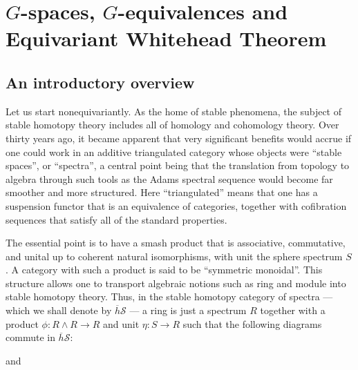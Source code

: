 \chapter{$G$-spaces, $G$-equivalences and Equivariant Whitehead Theorem}

\section{An introductory overview}

Let us start nonequivariantly. As the home of stable phenomena, the subject of stable homotopy theory includes all of homology and cohomology theory. Over thirty years ago, it became apparent that very significant benefits would accrue if one could work in an additive triangulated category whose objects were ``stable spaces'', or ``spectra'', a central point being that the translation from topology to algebra through such tools as the Adams spectral sequence would become far smoother and more structured. Here ``triangulated'' means that one has a suspension functor that is an equivalence of categories, together with cofibration sequences that satisfy all of the standard properties.

The essential point is to have a smash product that is associative, commutative, and unital up to coherent natural isomorphisms, with unit the sphere spectrum $S$. A category with such a product is said to be ``symmetric monoidal''. This structure allows one to transport algebraic notions such as ring and module into stable homotopy theory. Thus, in the stable homotopy category of spectra --- which we shall denote by $\overline{h}\mathscr{S}$ --- a ring is just a spectrum $R$ together with a product $\phi: R \wedge R \longrightarrow R$ and unit $\eta: S \longrightarrow R$ such that the following diagrams commute in $\overline{h}\mathscr{S}$:

\begin{center}
\end{center}

and

\begin{center}
\end{center}

